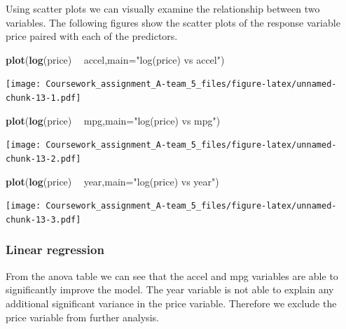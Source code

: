 \documentclass[]{article}
\newenvironment{Shaded}{\begin{snugshade}}{\end{snugshade}}
\newcommand{\KeywordTok}[1]{\textcolor[rgb]{0.13,0.29,0.53}{\textbf{#1}}}
\newcommand{\DataTypeTok}[1]{\textcolor[rgb]{0.13,0.29,0.53}{#1}}
\newcommand{\StringTok}[1]{\textcolor[rgb]{0.31,0.60,0.02}{#1}}
\newcommand{\OperatorTok}[1]{\textcolor[rgb]{0.81,0.36,0.00}{\textbf{#1}}}
\newcommand{\NormalTok}[1]{#1}
\begin{document}
Using scatter plots we can visually examine the relationship between two
variables. The following figures show the scatter plots of the response
variable price paired with each of the predictors.

\begin{Shaded}
\begin{Highlighting}[]
\KeywordTok{plot}\NormalTok{(}\KeywordTok{log}\NormalTok{(price) }\OperatorTok{~}\StringTok{ }\NormalTok{accel,}\DataTypeTok{main=}\StringTok{"log(price) vs accel"}\NormalTok{)}
\end{Highlighting}
\end{Shaded}

\texttt{[image: Coursework\_assignment\_A-team\_5\_files/figure-latex/unnamed-chunk-13-1.pdf]}

\begin{Shaded}
\begin{Highlighting}[]
\KeywordTok{plot}\NormalTok{(}\KeywordTok{log}\NormalTok{(price) }\OperatorTok{~}\StringTok{ }\NormalTok{mpg,}\DataTypeTok{main=}\StringTok{"log(price) vs mpg"}\NormalTok{)}
\end{Highlighting}
\end{Shaded}

\texttt{[image: Coursework\_assignment\_A-team\_5\_files/figure-latex/unnamed-chunk-13-2.pdf]}

\begin{Shaded}
\begin{Highlighting}[]
\KeywordTok{plot}\NormalTok{(}\KeywordTok{log}\NormalTok{(price) }\OperatorTok{~}\StringTok{ }\NormalTok{year,}\DataTypeTok{main=}\StringTok{"log(price) vs year"}\NormalTok{)}
\end{Highlighting}
\end{Shaded}

\texttt{[image: Coursework\_assignment\_A-team\_5\_files/figure-latex/unnamed-chunk-13-3.pdf]}

\subsubsection{Linear regression}\label{linear-regression}

From the anova table we can see that the accel and mpg variables are
able to significantly improve the model. The year variable is not able
to explain any additional significant variance in the price variable.
Therefore we exclude the price variable from further analysis.
\end{document}
